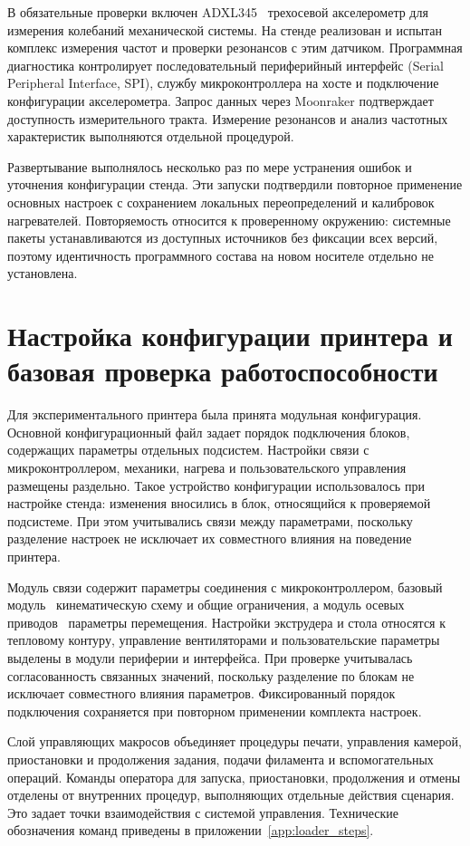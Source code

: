 В обязательные проверки включен ADXL345~\textemdash{} трехосевой акселерометр для измерения колебаний механической системы. На стенде реализован и испытан комплекс измерения частот и проверки резонансов с этим датчиком. Программная диагностика контролирует последовательный периферийный интерфейс (Serial Peripheral Interface, SPI), службу микроконтроллера на хосте и подключение конфигурации акселерометра. Запрос данных через Moonraker подтверждает доступность измерительного тракта. Измерение резонансов и анализ частотных характеристик выполняются отдельной процедурой.

Развертывание выполнялось несколько раз по мере устранения ошибок и уточнения конфигурации стенда. Эти запуски подтвердили повторное применение основных настроек с сохранением локальных переопределений и калибровок нагревателей. Повторяемость относится к проверенному окружению: системные пакеты устанавливаются из доступных источников без фиксации всех версий, поэтому идентичность программного состава на новом носителе отдельно не установлена.

\section{Настройка конфигурации принтера и базовая проверка работоспособности}

Для экспериментального принтера была принята модульная конфигурация. Основной конфигурационный файл задает порядок подключения блоков, содержащих параметры отдельных подсистем. Настройки связи с микроконтроллером, механики, нагрева и пользовательского управления размещены раздельно. Такое устройство конфигурации использовалось при настройке стенда: изменения вносились в блок, относящийся к проверяемой подсистеме. При этом учитывались связи между параметрами, поскольку разделение настроек не исключает их совместного влияния на поведение принтера.

Модуль связи содержит параметры соединения с микроконтроллером, базовый модуль~\textemdash{} кинематическую схему и общие ограничения, а модуль осевых приводов~\textemdash{} параметры перемещения. Настройки экструдера и стола относятся к тепловому контуру, управление вентиляторами и пользовательские параметры выделены в модули периферии и интерфейса. При проверке учитывалась согласованность связанных значений, поскольку разделение по блокам не исключает совместного влияния параметров. Фиксированный порядок подключения сохраняется при повторном применении комплекта настроек.

Слой управляющих макросов объединяет процедуры печати, управления камерой, приостановки и продолжения задания, подачи филамента и вспомогательных операций. Команды оператора для запуска, приостановки, продолжения и отмены отделены от внутренних процедур, выполняющих отдельные действия сценария. Это задает точки взаимодействия с системой управления. Технические обозначения команд приведены в приложении~\ref{app:loader_steps}.


